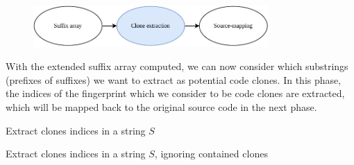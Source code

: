 \begin{figure}[H]
    \begin{center}
        \includegraphics[width=0.8\textwidth]{figures/phases/phases_cloneextraction.drawio.pdf}
    \end{center}
\end{figure}

With the extended suffix array computed, we can now consider which substrings (prefixes of
suffixes) we want to extract as potential code clones. In this phase, the indices of the
fingerprint which we consider to be code clones are extracted, which will be mapped back
to the original source code in the next phase.

\begin{algorithm}[t]
  \SetAlgoLined\DontPrintSemicolon

  \vspace{0.5cm}
  \caption{Extract clones indices in a string $S$}
  \label{alg:simplecloneextraction}
\end{algorithm}

\begin{algorithm}[t]
  \SetAlgoLined\DontPrintSemicolon

  \vspace{0.5cm}
  \caption{Extract clones indices in a string $S$, ignoring contained clones}
  \label{alg:cloneextraction}
\end{algorithm}

